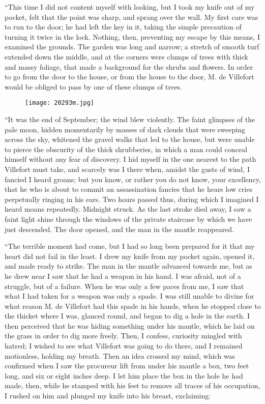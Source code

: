 “This time I did not content myself with looking, but I took my knife
out of my pocket, felt that the point was sharp, and sprang over the
wall. My first care was to run to the door; he had left the key in it,
taking the simple precaution of turning it twice in the lock. Nothing,
then, preventing my escape by this means, I examined the grounds. The
garden was long and narrow; a stretch of smooth turf extended down the
middle, and at the corners were clumps of trees with thick and massy
foliage, that made a background for the shrubs and flowers. In order to
go from the door to the house, or from the house to the door, M. de
Villefort would be obliged to pass by one of these clumps of trees.

\begin{figure}[ht]
\texttt{[image: 20293m.jpg]}
\end{figure}

“It was the end of September; the wind blew violently. The faint
glimpses of the pale moon, hidden momentarily by masses of dark clouds
that were sweeping across the sky, whitened the gravel walks that led
to the house, but were unable to pierce the obscurity of the thick
shrubberies, in which a man could conceal himself without any fear of
discovery. I hid myself in the one nearest to the path Villefort must
take, and scarcely was I there when, amidst the gusts of wind, I
fancied I heard groans; but you know, or rather you do not know, your
excellency, that he who is about to commit an assassination fancies
that he hears low cries perpetually ringing in his ears. Two hours
passed thus, during which I imagined I heard moans repeatedly. Midnight
struck. As the last stroke died away, I saw a faint light shine through
the windows of the private staircase by which we have just descended.
The door opened, and the man in the mantle reappeared.

“The terrible moment had come, but I had so long been prepared for it
that my heart did not fail in the least. I drew my knife from my pocket
again, opened it, and made ready to strike. The man in the mantle
advanced towards me, but as he drew near I saw that he had a weapon in
his hand. I was afraid, not of a struggle, but of a failure. When he
was only a few paces from me, I saw that what I had taken for a weapon
was only a spade. I was still unable to divine for what reason M. de
Villefort had this spade in his hands, when he stopped close to the
thicket where I was, glanced round, and began to dig a hole in the
earth. I then perceived that he was hiding something under his mantle,
which he laid on the grass in order to dig more freely. Then, I
confess, curiosity mingled with hatred; I wished to see what Villefort
was going to do there, and I remained motionless, holding my breath.
Then an idea crossed my mind, which was confirmed when I saw the
procureur lift from under his mantle a box, two feet long, and six or
eight inches deep. I let him place the box in the hole he had made,
then, while he stamped with his feet to remove all traces of his
occupation, I rushed on him and plunged my knife into his breast,
exclaiming:

